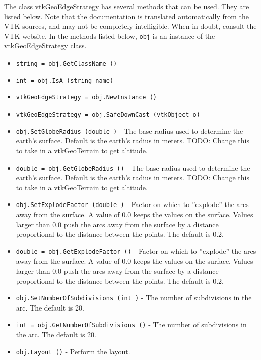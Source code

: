 The class vtkGeoEdgeStrategy has several methods that can be used.
  They are listed below.
Note that the documentation is translated automatically from the VTK sources,
and may not be completely intelligible.  When in doubt, consult the VTK website.
In the methods listed below, \verb|obj| is an instance of the vtkGeoEdgeStrategy class.
\begin{itemize}
\item  \verb|string = obj.GetClassName ()|

\item  \verb|int = obj.IsA (string name)|

\item  \verb|vtkGeoEdgeStrategy = obj.NewInstance ()|

\item  \verb|vtkGeoEdgeStrategy = obj.SafeDownCast (vtkObject o)|

\item  \verb|obj.SetGlobeRadius (double )| -  The base radius used to determine the earth's surface.
 Default is the earth's radius in meters.
 TODO: Change this to take in a vtkGeoTerrain to get altitude.

\item  \verb|double = obj.GetGlobeRadius ()| -  The base radius used to determine the earth's surface.
 Default is the earth's radius in meters.
 TODO: Change this to take in a vtkGeoTerrain to get altitude.

\item  \verb|obj.SetExplodeFactor (double )| -  Factor on which to ''explode'' the arcs away from the surface.
 A value of 0.0 keeps the values on the surface.
 Values larger than 0.0 push the arcs away from the surface by a distance
 proportional to the distance between the points.
 The default is 0.2.

\item  \verb|double = obj.GetExplodeFactor ()| -  Factor on which to ''explode'' the arcs away from the surface.
 A value of 0.0 keeps the values on the surface.
 Values larger than 0.0 push the arcs away from the surface by a distance
 proportional to the distance between the points.
 The default is 0.2.

\item  \verb|obj.SetNumberOfSubdivisions (int )| -  The number of subdivisions in the arc.
 The default is 20.

\item  \verb|int = obj.GetNumberOfSubdivisions ()| -  The number of subdivisions in the arc.
 The default is 20.

\item  \verb|obj.Layout ()| -  Perform the layout.

\end{itemize}

